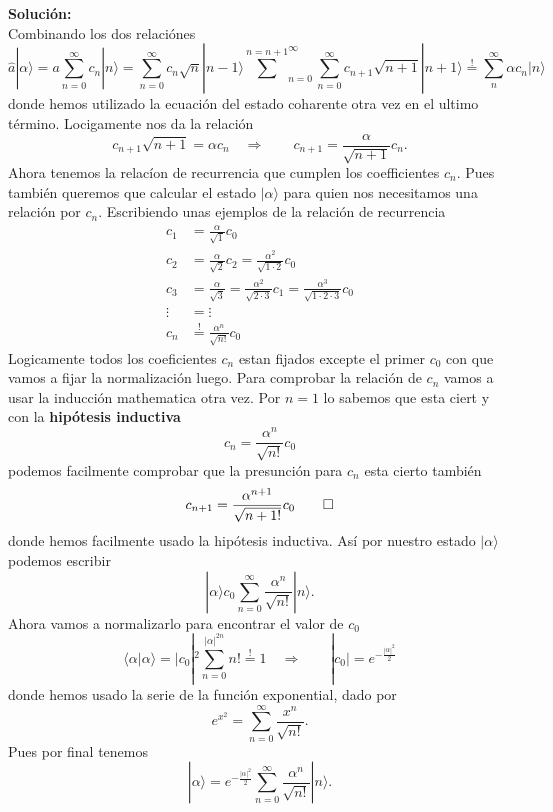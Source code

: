  \\\\
\textbf{Solución:} \\
Combinando los dos relaciónes 
$$
	\hat a | \alpha \rangle = a \sum_{n=0}^\infty c_n | n\rangle =
\sum_{n=0}^\infty c_n \sqrt n | n-1\rangle \overset{n=n+1} \sum_{n=0}^\infty
\sum_{n=0}^\infty c_{n+1} \sqrt{n+1} |n+1\rangle \overset{!}{=} \sum_n^\infty
\alpha c_n | n\rangle
$$
donde hemos utilizado la ecuación del estado coharente otra vez en el ultimo
término. Locigamente nos da la relación
$$
	c_{n+1} \sqrt{n+1} = \alpha c_n \quad \Rightarrow \qquad c_{n+1} =
\frac{\alpha}{\sqrt{n+1}} c_n.
$$
Ahora tenemos la relacíon de recurrencia que cumplen los coefficientes $c_n$.
Pues también queremos que calcular el estado $|\alpha\rangle$ para quien nos
necesitamos una relación por $c_n$. Escribiendo unas ejemplos de la relación de
recurrencia 
\begin{align*}
	c_1 &= \frac{\alpha}{\sqrt 1} c_0 \\
	c_2 &= \frac{\alpha}{\sqrt 2} c_2 = \frac{\alpha^2}{\sqrt{1\cdot 2}} c_0 \\
	c_3 &= \frac{\alpha}{\sqrt 3} = \frac{\alpha^2}{\sqrt{2 \cdot 3}} c_1 =
\frac{\alpha^3}{\sqrt{1 \cdot 2 \cdot 3}} c_0 \\
	\vdots &= \vdots \\
	c_n &\overset{!}{=} \frac{\alpha^n}{\sqrt{n!}} c_0
\end{align*}
Logicamente todos los coeficientes $c_n$ estan fijados excepte el primer $c_0$
con que vamos a fijar la normalización luego. Para comprobar la relación de
$c_n$ vamos a usar la inducción mathematica otra vez. Por $n=1$ lo sabemos que
esta ciert y con la  \textbf{hipótesis
inductiva} 
$$
	c_n = \frac{\alpha^n}{\sqrt{n!}} c_0
$$
podemos facilmente comprobar que la presunción para $c_n$ esta cierto también
$$
	c_{n+1} = \frac{\alpha^{n+1}}{\sqrt{n+1!}} c_0 \qed
$$
donde hemos facilmente usado la hipótesis inductiva. Así por nuestro estado
$|\alpha\rangle$ podemos escribir
$$
	|\alpha\rangle c_0 \sum_{n=0}^\infty \frac{\alpha^n}{\sqrt{n!}} | n\rangle.
$$
Ahora vamos a normalizarlo para encontrar el valor de $c_0$
$$
	\langle \alpha | \alpha \rangle = | c_0 |^2 \sum_{n=0}^{|\alpha|^{2n}}{n!}
\overset{!}{=} 1 \quad \Rightarrow \qquad |c_0| = e^{- \frac{|\alpha|^2}{2}}
$$
donde hemos usado la serie de la función exponential, dado por
$$
	e^{x^2} = \sum_{n=0}^\infty \frac{x^n}{\sqrt{n!}}.
$$
Pues por final tenemos
$$
	|\alpha \rangle = e^{- \frac{|\alpha|^2}{2}} \sum_{n=0}^\infty
\frac{\alpha^n}{\sqrt{n!}} | n\rangle.
$$




